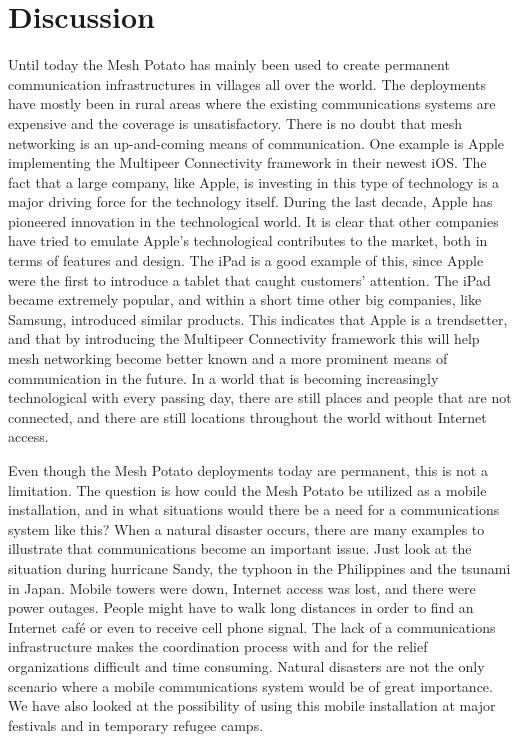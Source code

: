\chapter{Discussion}
\label{chp:discussion} 

Until today the Mesh Potato has mainly been used to create permanent communication infrastructures in villages all over the world. The deployments have mostly been in rural areas where the existing communications systems are expensive and the coverage is unsatisfactory. There is no doubt that mesh networking is an up-and-coming means of communication. One example is Apple implementing the Multipeer Connectivity framework in their newest iOS. The fact that a large company, like Apple, is investing in this type of technology is a major driving force for the technology itself. During the last decade, Apple has pioneered innovation in the technological world. It is clear that other companies have tried to emulate Apple's technological contributes to the market, both in terms of features and design. The iPad is a good example of this, since Apple were the first to introduce a tablet that caught customers' attention. The iPad became extremely popular, and within a short time other big companies, like Samsung, introduced similar products. This indicates that Apple is a trendsetter, and that by introducing the Multipeer Connectivity framework this will help mesh networking become better known and a more prominent means of communication in the future. In a world that is becoming increasingly technological with every passing day, there are still places and people that are not connected, and there are still locations throughout the world without Internet access. 

Even though the Mesh Potato deployments today are permanent, this is not a limitation. The question is how could the Mesh Potato be utilized as a mobile installation, and in what situations would there be a need for a communications system like this? When a natural disaster occurs, there are many examples to illustrate that communications become an important issue. Just look at the situation during hurricane Sandy, the typhoon in the Philippines and the tsunami in Japan. Mobile towers were down, Internet access was lost, and there were power outages. People might have to walk long distances in order to find an Internet café or even to receive cell phone signal. The lack of a communications infrastructure makes the coordination process with and for the relief organizations difficult and time consuming. Natural disasters are not the only scenario where a mobile communications system would be of great importance. We have also looked at the possibility of using this mobile installation at major festivals and in temporary refugee camps. 

